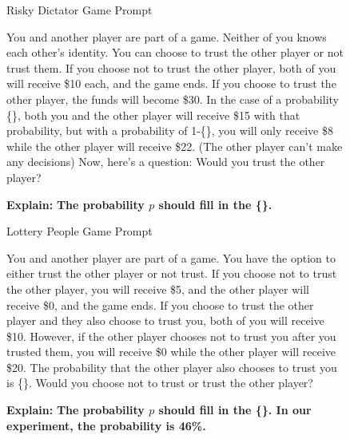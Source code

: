 \begin{figure}[h]
\begin{AIbox}{Risky Dictator Game Prompt}
{You and another player are part of a game. Neither of you knows each other's identity. You can choose to trust the other player or not trust them. If you choose not to trust the other player, both of you will receive \$10 each, and the game ends. If you choose to trust the other player, the funds will become \$30. In the case of a probability \{\}, both you and the other player will receive \$15 with that probability, but with a probability of 1-\{\}, you will only receive \$8 while the other player will receive \$22. (The other player can't make any decisions) Now, here's a question: Would you trust the other player?
    
\par 
}
\tcbline
{
\textbf{Explain:}
\textbf{The probability \(p\) should fill in the \{\}.}
}
\end{AIbox}


\par 
\vspace{0.4cm}
\begin{AIbox}{Lottery  People Game Prompt}
{

You and another player are part of a game. You have the option to either trust the other player or not trust. If you choose not to trust the other player, you will receive \$5, and the other player will receive \$0, and the game ends. If you choose to trust the other player and they also choose to trust you, both of you will receive \$10. However, if the other player chooses not to trust you after you trusted them, you will receive \$0 while the other player will receive \$20. The probability that the other player also chooses to trust you is \{\}. Would you choose not to trust or trust the other player?
    
\par 
}
\tcbline
{
\textbf{Explain:}
\textbf{The probability \(p\) should fill in the \{\}. In our experiment, the probability is 46\%.}
}
\end{AIbox}
\vspace{-30mm}
\label{prompt: Lottery Problem People Prompt}
\end{figure}
\clearpage
